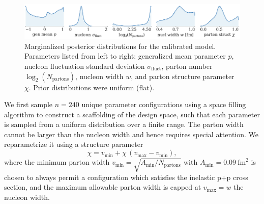 \documentclass[3p,times,procedia]{elsarticle}
\newcommand{\paddedhline}{\noalign{\smallskip}\hline\noalign{\smallskip}}
\begin{document}
\begin{figure}
  \includegraphics{posterior}
  \caption{
    \label{fig:posterior} Marginalized posterior distributions for the calibrated model.
    Parameters listed from left to right: generalized mean parameter $p$, nucleon fluctuation standard deviation $\sigma_\mathrm{fluct}$, parton number $\log_2(N_\mathrm{partons})$, nucleon width $w$, and parton structure parameter $\chi$.
    Prior distributions were uniform (flat).
  }
\end{figure}

We first sample $n=240$ unique parameter configurations using a space filling algorithm to construct a scaffolding of the design space, such that each parameter is sampled from a uniform distribution over a finite range.
The parton width cannot be larger than the nucleon width and hence requires special attention.
We reparametrize it using a structure parameter 
\begin{equation}
  \chi = v_\mathrm{min} + \chi\, (v_\mathrm{max} - v_\mathrm{min}), 
\end{equation}
where the minimum parton width $v_\mathrm{min}=\sqrt{A_\mathrm{min}/N_\mathrm{partons}}$ with $A_\mathrm{min}=0.09 ~\mathrm{fm}^2$ is chosen to always permit a configuration which satisfies the inelastic p+p cross section, and the maximum allowable parton width is capped at $v_\mathrm{max} = w$ the nucleon width.
%
\end{document}

